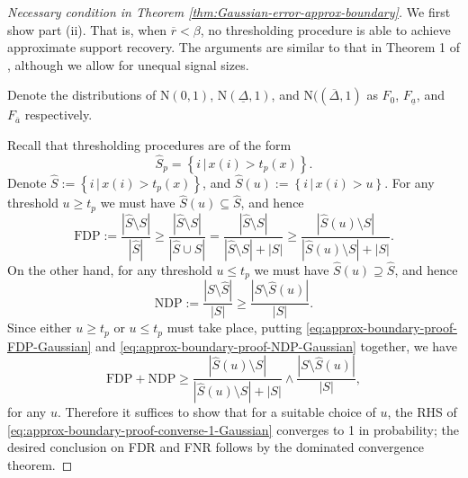 \begin{proof}[Necessary condition in Theorem \ref{thm:Gaussian-error-approx-boundary}]
We first show part {\rm (ii)}.  That is, when $\overline{r} < \beta$, no thresholding procedure is able to achieve approximate support recovery.
The arguments are similar to that in Theorem 1 of \cite{arias2017distribution}, although we allow for unequal signal sizes. 

Denote the distributions of $\mathrm{N}(0,1)$, $\mathrm{N}(\underline{\Delta}, 1)$, and $\mathrm{N}((\overline{\Delta}, 1)$ as $F_0$, $F_{\underline{a}}$, and $F_{\overline{a}}$ respectively.


Recall that thresholding procedures are of the form
$$
\widehat{S}_p = \left\{i\,|\,x(i) > t_p(x)\right\}.
$$
Denote $\widehat{S} := \left\{i\,|\,x(i) > t_p(x)\right\}$, and $\widehat{S}(u) := \left\{i\,|\,x(i) > u\right\}$.
For any threshold $u\ge t_p$ we must have $\widehat{S}(u)\subseteq\widehat{S}$, and hence
\begin{equation} \label{eq:approx-boundary-proof-FDP-Gaussian}
    \text{FDP} := \frac{|\widehat{S}\setminus{S}|}{|\widehat{S}|} \ge \frac{|\widehat{S}\setminus{S}|}{|\widehat{S}\cup{S}|} = \frac{|\widehat{S}\setminus{S}|}{|\widehat{S}\setminus{S}| + |S|} \ge
    \frac{|\widehat{S}(u)\setminus{S}|}{|\widehat{S}(u)\setminus{S}| + |S|}.
\end{equation}
On the other hand, for any threshold $u\le t_p$ we must have $\widehat{S}(u)\supseteq\widehat{S}$, and hence
\begin{equation} \label{eq:approx-boundary-proof-NDP-Gaussian}
    \text{NDP} := \frac{|{S}\setminus\widehat{S}|}{|{S}|} \ge 
    \frac{|{S}\setminus\widehat{S}(u)|}{|{S}|}.
\end{equation}
Since either $u\ge t_p$ or  $u\le t_p$ must take place, putting \eqref{eq:approx-boundary-proof-FDP-Gaussian} and \eqref{eq:approx-boundary-proof-NDP-Gaussian} together, we have
\begin{equation} \label{eq:approx-boundary-proof-converse-1-Gaussian}
    \text{FDP} + \text{NDP} 
    \ge \frac{|\widehat{S}(u)\setminus{S}|}{|\widehat{S}(u)\setminus{S}|+|{S}|} \wedge \frac{|{S}\setminus\widehat{S}(u)|}{|{S}|},
\end{equation}
for any $u$.
Therefore it suffices to show that for a suitable choice of $u$, the RHS of \eqref{eq:approx-boundary-proof-converse-1-Gaussian} converges to 1 in probability; the desired conclusion on FDR and FNR follows by the dominated convergence theorem.


\end{proof}
